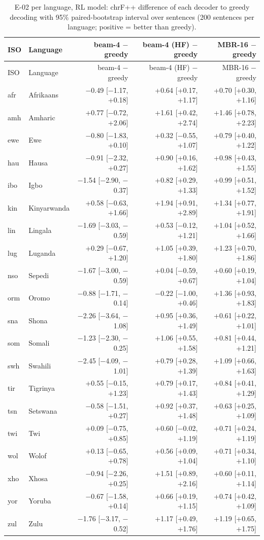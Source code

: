 {\scriptsize\setlength{\tabcolsep}{1.5pt}
\begin{longtable}{@{}llrrr@{}}
\caption{E-02 per language, RL model: chrF++ difference of each decoder to greedy decoding with 95\% paired-bootstrap interval over sentences (200 sentences per language; positive = better than greedy).}\label{tab:dec-d-rl-pp}\\
\toprule
ISO & Language & beam-4 $-$ greedy & beam-4 (HF) $-$ greedy & MBR-16 $-$ greedy \\
\midrule\endfirsthead
\toprule
ISO & Language & beam-4 $-$ greedy & beam-4 (HF) $-$ greedy & MBR-16 $-$ greedy \\
\midrule\endhead
\midrule\endfoot
\bottomrule\endlastfoot
afr & Afrikaans & $-$0.49 [$-$1.17, +0.18] & +0.64 [+0.17, +1.17] & +0.70 [+0.30, +1.16] \\
amh & Amharic & +0.77 [$-$0.72, +2.06] & +1.61 [+0.42, +2.74] & +1.46 [+0.78, +2.23] \\
ewe & Ewe & $-$0.80 [$-$1.83, +0.10] & +0.32 [$-$0.55, +1.07] & +0.79 [+0.40, +1.22] \\
hau & Hausa & $-$0.91 [$-$2.32, +0.27] & +0.90 [+0.16, +1.62] & +0.98 [+0.43, +1.55] \\
ibo & Igbo & $-$1.54 [$-$2.90, $-$0.37] & +0.82 [+0.29, +1.33] & +0.99 [+0.51, +1.52] \\
kin & Kinyarwanda & +0.58 [$-$0.63, +1.66] & +1.94 [+0.91, +2.89] & +1.34 [+0.77, +1.91] \\
lin & Lingala & $-$1.69 [$-$3.03, $-$0.59] & +0.53 [$-$0.12, +1.21] & +1.04 [+0.52, +1.66] \\
lug & Luganda & +0.29 [$-$0.67, +1.20] & +1.05 [+0.39, +1.80] & +1.23 [+0.70, +1.86] \\
nso & Sepedi & $-$1.67 [$-$3.00, $-$0.59] & +0.04 [$-$0.59, +0.67] & +0.60 [+0.19, +1.04] \\
orm & Oromo & $-$0.88 [$-$1.71, $-$0.14] & $-$0.22 [$-$1.00, +0.46] & +1.36 [+0.93, +1.83] \\
sna & Shona & $-$2.26 [$-$3.64, $-$1.08] & +0.95 [+0.36, +1.49] & +0.61 [+0.22, +1.01] \\
som & Somali & $-$1.23 [$-$2.30, $-$0.25] & +1.06 [+0.55, +1.58] & +0.81 [+0.44, +1.21] \\
swh & Swahili & $-$2.45 [$-$4.09, $-$1.01] & +0.79 [+0.28, +1.39] & +1.09 [+0.66, +1.63] \\
tir & Tigrinya & +0.55 [$-$0.15, +1.23] & +0.79 [+0.17, +1.43] & +0.84 [+0.41, +1.29] \\
tsn & Setswana & $-$0.58 [$-$1.51, +0.27] & +0.92 [+0.37, +1.48] & +0.63 [+0.25, +1.09] \\
twi & Twi & +0.09 [$-$0.75, +0.85] & +0.60 [$-$0.02, +1.19] & +0.71 [+0.24, +1.19] \\
wol & Wolof & +0.13 [$-$0.65, +0.78] & +0.56 [+0.09, +1.04] & +0.71 [+0.34, +1.10] \\
xho & Xhosa & $-$0.94 [$-$2.26, +0.25] & +1.51 [+0.89, +2.16] & +0.60 [+0.11, +1.14] \\
yor & Yoruba & $-$0.67 [$-$1.58, +0.14] & +0.66 [+0.19, +1.15] & +0.74 [+0.42, +1.09] \\
zul & Zulu & $-$1.76 [$-$3.17, $-$0.52] & +1.17 [+0.49, +1.76] & +1.19 [+0.65, +1.75] \\
\end{longtable}}
